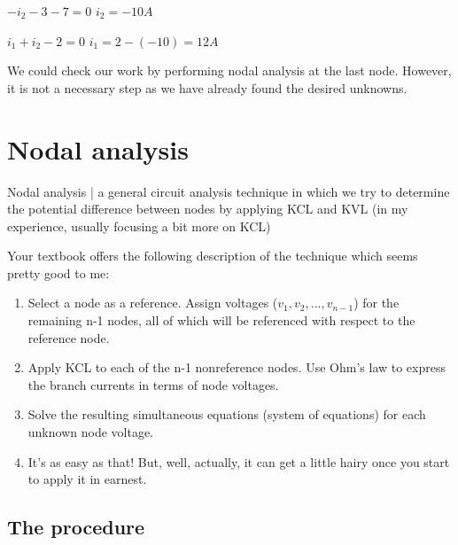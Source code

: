 \documentclass[11pt]{book}
\begin{document}
\subitem $-i_2 - 3 - 7 = 0$
\subitem $i_2 = -10 A$

\subitem $i_1 + i_2 - 2 = 0$
\subitem $i_1 = 2 - (-10) = 12 A$

We could check our work by performing nodal analysis at the last node. However, it is not a necessary step as we have already found the desired unknowns.



\newpage
\section{Nodal analysis}
Nodal analysis | a general circuit analysis technique in which we try to determine the potential difference between nodes by applying KCL and KVL (in my experience, usually focusing a bit more on KCL)

Your textbook offers the following description of the technique which seems pretty good to me:
\begin{enumerate}
	\item Select a node as a reference. Assign voltages ($v_1, v_2, ..., v_{n-1}$) for the remaining n-1 nodes, all of which will be referenced with respect to the reference node.
	\item Apply KCL to each of the n-1 nonreference nodes. Use Ohm’s law to express the branch currents in terms of node voltages.
	\item Solve the resulting simultaneous equations (system of equations) for each unknown node voltage.
	\item It's as easy as that! But, well, actually, it can get a little hairy once you start to apply it in earnest.
\end{enumerate}


\subsection{The procedure}
\end{document}
